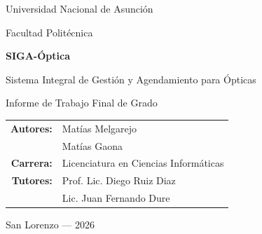 
\begin{titlepage}
\centering

\vspace*{1.5cm}

{\large Universidad Nacional de Asunción\par}
{\large Facultad Politécnica\par}

\vspace{2.5cm}

{\Huge\bfseries SIGA-Óptica\par}
\vspace{0.4cm}
{\Large Sistema Integral de Gestión y Agendamiento para Ópticas\par}
\vspace{0.3cm}
{\large Informe de Trabajo Final de Grado\par}

\vspace{2.5cm}

\begin{tabular}{rl}
\textbf{Autores:}                  & Matías Melgarejo \\[2pt]
                                    & Matías Gaona \\[4pt]
\textbf{Carrera:}                  & Licenciatura en Ciencias Informáticas \\[4pt]
\textbf{Tutores:}                  & Prof. Lic. Diego Ruiz Diaz \\[2pt]
                                    & Lic. Juan Fernando Dure \\[4pt]
\end{tabular}

\vfill

{\large San Lorenzo --- 2026\par}

\vspace{1cm}

\end{titlepage}

\clearpage
